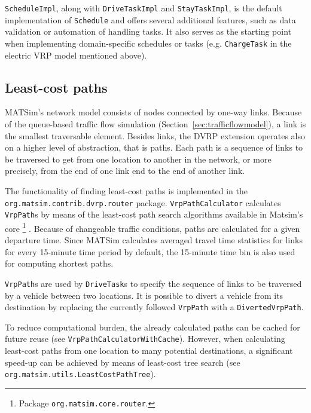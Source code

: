 \lstinline$ScheduleImpl$, along with \lstinline$DriveTaskImpl$ and \lstinline$StayTaskImpl$, is the default implementation of \lstinline$Schedule$ and offers several additional features, such as data validation or automation of handling tasks. It also serves as the starting point when implementing domain-specific schedules or tasks (e.g. \lstinline$ChargeTask$ in the electric VRP model mentioned above).

\subsection{Least-cost paths}
\label{sec:VRP-router}

MATSim's network model consists of nodes connected by one-way links. Because of the queue-based traffic flow simulation (Section~\ref{sec:trafficflowmodel}), a link is the smallest traversable element. Besides links, the DVRP extension operates also on a higher level of abstraction, that is paths. Each path is a sequence of links to be traversed to get from one location to another in the network, or more precisely, from the end of one link end to the end of another link. 

The functionality of finding least-cost paths is implemented in the \lstinline$org.matsim.contrib.dvrp.router$ package. \lstinline$VrpPathCalculator$ calculates \lstinline$VrpPath$s by means of the least-cost path search algorithms available in Matsim's core%
\footnote{
Package \lstinline$org.matsim.core.router$.
}
\citep{JacobMaratheEtAl1999computationalstudyof,LefebvreBalmer2007Fastshortestpath}. Because of changeable traffic conditions, paths are calculated for a given departure time. Since MATSim calculates averaged travel time statistics for links for every 15-minute time period by default, the 15-minute time bin is also used for computing shortest paths.

\lstinline$VrpPath$s are used by \lstinline$DriveTask$s to specify the sequence of links to be traversed by a vehicle between two locations. It is possible to divert a vehicle from its destination by replacing the currently followed \lstinline$VrpPath$ with a \lstinline$DivertedVrpPath$.

To reduce computational burden, the already calculated paths can be cached for future reuse (see \lstinline$VrpPathCalculatorWithCache$). However, when calculating least-cost paths from one location to many potential destinations, a significant speed-up can be achieved by means of least-cost tree search (see \lstinline$org.matsim.utils.LeastCostPathTree$).

